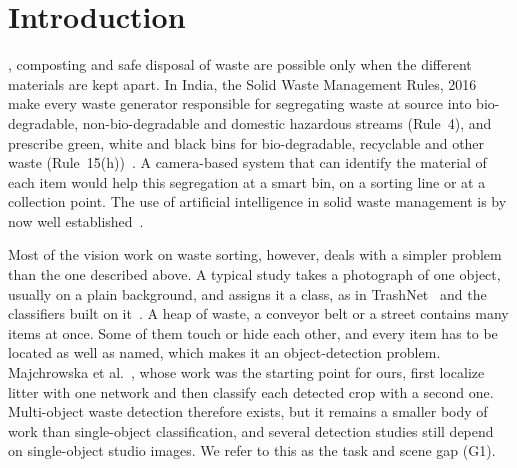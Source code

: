 \section{Introduction}
\label{sec:intro}

, composting and safe disposal of waste are possible only when the different materials are kept apart. In India, the Solid Waste Management Rules, 2016 make every waste generator responsible for segregating waste at source into bio-degradable, non-bio-degradable and domestic hazardous streams (Rule~4), and prescribe green, white and black bins for bio-degradable, recyclable and other waste (Rule~15(h))~\cite{moefcc2016solid}. A camera-based system that can identify the material of each item would help this segregation at a smart bin, on a sorting line or at a collection point. The use of artificial intelligence in solid waste management is by now well established~\cite{abdallah2020artificial,fang2023artificial}.

Most of the vision work on waste sorting, however, deals with a simpler problem than the one described above. A typical study takes a photograph of one object, usually on a plain background, and assigns it a class, as in TrashNet~\cite{yang2016classification} and the classifiers built on it~\cite{kaya2023classification}. A heap of waste, a conveyor belt or a street contains many items at once. Some of them touch or hide each other, and every item has to be located as well as named, which makes it an object-detection problem. Majchrowska et al.~\cite{majchrowska2022deep}, whose work was the starting point for ours, first localize litter with one network and then classify each detected crop with a second one. Multi-object waste detection therefore exists, but it remains a smaller body of work than single-object classification, and several detection studies still depend on single-object studio images. We refer to this as the task and scene gap (G1).

